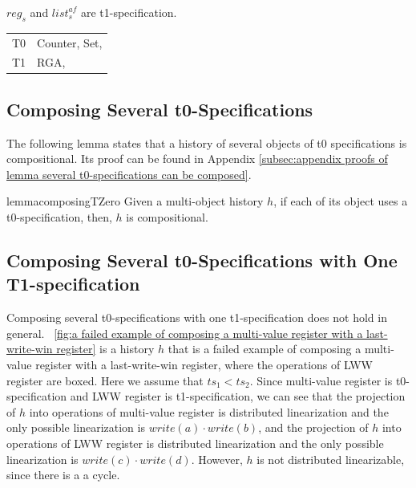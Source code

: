 \begin{lemma}
\label{lemma:several t1-specifications}
$\mathit{reg}_s$ and $\mathit{list}_s^{\mathit{af}}$ are t1-specification.
\end{lemma}

\begin{table}
  \centering
  \begin{tabular}[t]{l|l}
    T0 & Counter, Set, \\
    T1 & RGA,
  \end{tabular}
\end{table}




\subsection{Composing Several t0-Specifications}
\label{lemma:several t0-specifications can be composed}

The following lemma states that a history of several objects of t0 specifications is compositional. Its proof can be found in Appendix \ref{subsec:appendix proofs of lemma several t0-specifications can be composed}.

\begin{restatable}{lemma}{composingTZero}
\label{lemma:several t0-specifications can be composed}
Given a multi-object history $h$, if each of its object uses a t0-specification, then, $h$ is compositional.
\end{restatable}




\subsection{Composing Several t0-Specifications with One T1-specification}
\label{lemma:composing several t0-specification with one t1-specification}

Composing several t0-specifications with one t1-specification does not hold in general. \figurename~\ref{fig:a failed example of composing a multi-value register with a last-write-win register} is a history $h$ that is a failed example of composing a multi-value register with a last-write-win register, where the operations of LWW register are boxed. Here we assume that $\mathit{ts}_1<\mathit{ts}_2$. Since multi-value register is t0-specification and LWW register is t1-specification, we can see that the projection of $h$ into operations of multi-value register is distributed linearization and the only possible linearization is $\mathit{write}(a) \cdot \mathit{write}(b)$, and the projection of $h$ into operations of LWW register is distributed linearization and the only possible linearization is $\mathit{write}(c) \cdot \mathit{write}(d)$. However, $h$ is not distributed linearizable, since there is a a cycle.

